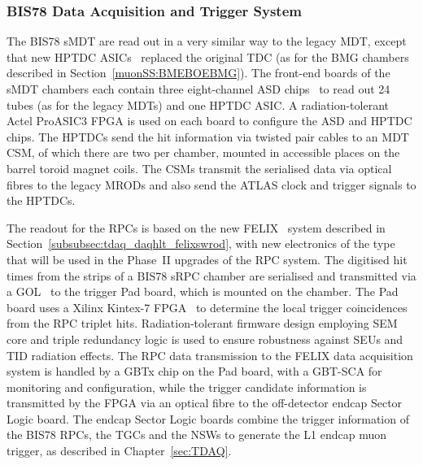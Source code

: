 \documentclass[cernpreprint, atlasdraft=false, UKenglish,british,orcidlogo, texmf, orcidlogo]{atlasdoc}
\begin{document}
\subsubsection{BIS78 Data Acquisition and Trigger System}
The \gls{BIS78} \gls{sMDT} are read out in a very similar way to the legacy \gls{MDT}, except that new \gls{HPTDC} \glspl{ASIC}~\cite{HPTDC} replaced the original \gls{TDC} (as for the BMG chambers described in Section~\ref{muonSS:BMEBOEBMG}).
The front-end boards 
of the \gls{sMDT} chambers each contain three eight-channel \gls{ASD} chips~\cite{ASD} to read out \num{24} tubes (as for the legacy \glspl{MDT}) and one \gls{HPTDC} \gls{ASIC}. A radiation-tolerant Actel ProASIC3 \gls{FPGA} is used on each board to configure the \gls{ASD} and \gls{HPTDC} chips.
The \glspl{HPTDC} send the hit information via twisted pair cables to an \gls{MDT} \gls{CSM}, of which there are two per chamber, mounted in accessible places on the barrel toroid magnet coils. The \glspl{CSM} transmit the serialised
data via optical fibres to the legacy \glspl{MROD}
and also send the ATLAS clock and trigger signals to the \glspl{HPTDC}.
 
The readout for the \glspl{RPC} is based on the new \gls{FELIX}~\cite{FELIX} system described in Section~\ref{subsubsec:tdaq_daqhlt_felixswrod}, with new electronics of the type that will be used in the Phase~II upgrades of the \gls{RPC} system.
The digitised hit times from the strips of a \gls{BIS78} \gls{sRPC} chamber are serialised and transmitted via a \gls{GOL}~\cite{GOL} to the trigger Pad board, which is mounted on the chamber.
The Pad board uses a Xilinx Kintex-7 \gls{FPGA}~\cite{RPC_FPGA} to determine the local trigger coincidences from the \gls{RPC} triplet hits.
Radiation-tolerant firmware design employing \gls{SEM} core and triple redundancy logic is used to ensure robustness against \glspl{SEU} and \gls{TID} radiation effects.
The \gls{RPC} data transmission to the \gls{FELIX} data acquisition system is handled by a \gls{GBTx} chip on the Pad board, with a \gls{GBT-SCA}
for monitoring and configuration, while the trigger candidate information is transmitted by the \gls{FPGA} via an optical fibre to the off-detector endcap Sector Logic board.
The endcap Sector Logic boards combine the trigger information of the \gls{BIS78} \glspl{RPC}, the \glspl{TGC} and the \glspl{NSW} to generate the \gls{L1} endcap muon trigger, as described in Chapter~\ref{sec:TDAQ}.

\end{document}
